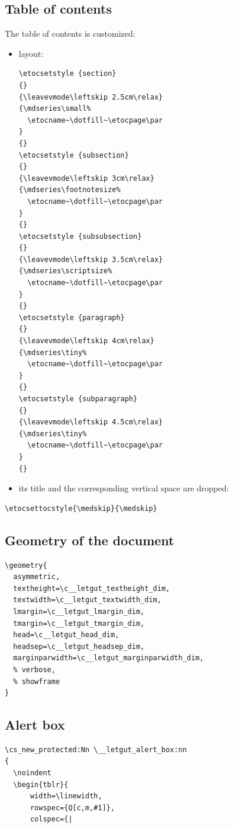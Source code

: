 \documentclass{letgut}
\begin{document}
\subsection{Table of contents}
\label{ImplementationTableofcontents-rhjg55h0jlj0}
The table of contents is customized:

\begin{itemize}
\item layout:
\begin{lstlisting}
\etocsetstyle {section}
{}
{\leavevmode\leftskip 2.5cm\relax}
{\mdseries\small%
  \etocname~\dotfill~\etocpage\par
}
{}
\etocsetstyle {subsection}
{}
{\leavevmode\leftskip 3cm\relax}
{\mdseries\footnotesize%
  \etocname~\dotfill~\etocpage\par
}
{}
\etocsetstyle {subsubsection}
{}
{\leavevmode\leftskip 3.5cm\relax}
{\mdseries\scriptsize%
  \etocname~\dotfill~\etocpage\par
}
{}
\etocsetstyle {paragraph}
{}
{\leavevmode\leftskip 4cm\relax}
{\mdseries\tiny%
  \etocname~\dotfill~\etocpage\par
}
{}
\etocsetstyle {subparagraph}
{}
{\leavevmode\leftskip 4.5cm\relax}
{\mdseries\tiny%
  \etocname~\dotfill~\etocpage\par
}
{}
\end{lstlisting}
\item its title and the corresponding vertical space are dropped:
\end{itemize}
\begin{lstlisting}
\etocsettocstyle{\medskip}{\medskip}
\end{lstlisting}
\subsection{Geometry of the document}
\label{ImplementationGeometryofthedocument-mqkg55h0jlj0}
\begin{lstlisting}
\geometry{
  asymmetric,
  textheight=\c__letgut_textheight_dim,
  textwidth=\c__letgut_textwidth_dim,
  lmargin=\c__letgut_lmargin_dim,
  tmargin=\c__letgut_tmargin_dim,
  head=\c__letgut_head_dim,
  headsep=\c__letgut_headsep_dim,
  marginparwidth=\c__letgut_marginparwidth_dim,
  % verbose,
  % showframe
}
\end{lstlisting}
\subsection{Alert box}
\label{ImplementationAlertbox-rblg55h0jlj0}
\begin{lstlisting}
\cs_new_protected:Nn \__letgut_alert_box:nn
{
  \noindent
  \begin{tblr}{
      width=\linewidth,
      rowspec={Q[c,m,#1]},
      colspec={|
\end{lstlisting}
\end{document}
